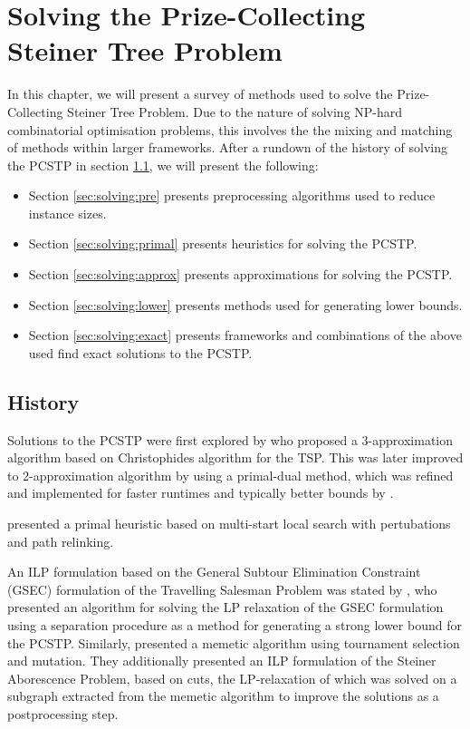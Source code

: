 \chapter{Solving the Prize-Collecting Steiner Tree Problem}
\label{chap:solving}

In this chapter, we will present a survey of methods used to solve the Prize-Collecting Steiner Tree Problem. Due to the nature of solving
NP-hard combinatorial optimisation problems, this involves the the mixing and matching of methods within larger frameworks.
 After a rundown of the history of solving the PCSTP in section \ref{sec:solving:history}, we will present the following:
\begin{itemize}
\item Section \ref{sec:solving:pre} presents preprocessing algorithms used to reduce instance sizes.
\item Section \ref{sec:solving:primal} presents heuristics for solving the PCSTP.
\item Section \ref{sec:solving:approx} presents approximations for solving the PCSTP.
\item Section \ref{sec:solving:lower} presents methods used for generating lower bounds.
\item Section \ref{sec:solving:exact} presents frameworks and combinations of the above used find exact solutions
   to the PCSTP.
\end{itemize}

\section{History}
\label{sec:solving:history}

Solutions to the PCSTP were first explored by \cite{Bienstock1993} who
proposed a 3-approximation algorithm based on Christophides algorithm for the TSP.
This was later improved to 2-approximation algorithm by
\cite{goemans1997primal} using a primal-dual method,
which was refined and implemented
for faster runtimes and typically better
bounds by \cite{Johnson:2000:PCS:338219.338637}.

\cite{canuto2001local} presented a primal heuristic based on multi-start
local search with pertubations and path relinking.

An ILP formulation based on the General Subtour Elimination Constraint (GSEC) formulation of the Travelling Salesman Problem was
stated by \cite{lucena2004strong}, who presented an algorithm for solving the LP relaxation of the GSEC formulation using
a separation procedure as a method for generating a strong lower bound for the PCSTP. Similarly, \cite{Ljubic:2004:memetic}
presented a memetic algorithm using tournament selection and mutation. They additionally presented an ILP formulation of the Steiner
 Aborescence Problem, based on cuts, the LP-relaxation of which was solved on a subgraph extracted from the memetic algorithm to
 improve the solutions as a postprocessing step.

